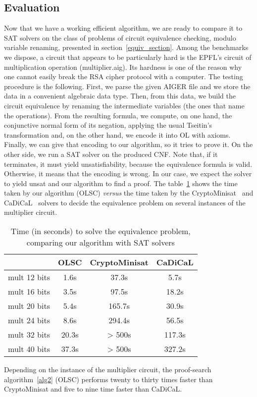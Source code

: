 \documentclass[a4paper, 11pt]{article}
\begin{document}
    \subsection{Evaluation}
    Now that we have a working efficient algorithm, we are ready to compare it to SAT solvers on the
    class of problems of circuit equivalence checking, modulo variable renaming, presented in 
    section~\ref{equiv_section}. Among the benchmarks we dispose, a circuit that appears to be
    particularly hard is the EPFL's circuit of multiplication operation (\textsf{multiplier.aig}). 
    Its hardness is one of the reason
    why one cannot easily break the RSA cipher protocol with a computer. The testing procedure is the
    following. First, we parse the given AIGER file and we store the data in a convenient algebraic
    data type. Then, from this data, we build the circuit equivalence by renaming the intermediate
    variables (the ones that name the operations). From the resulting formula, we compute, on one hand, 
    the conjunctive normal form of its negation, applying the usual Tseitin's transformation and, on 
    the other hand, we
    encode it into OL with axioms. Finally, we can give that encoding to our algorithm, so it tries
    to prove it. On the other side, we run a SAT solver on the produced CNF. Note that, if it terminates,
    it must yield unsatisfiability, because the equivalence formula is valid. Otherwise, it means that
    the encoding is wrong. 
    In our case, we expect the solver to yield unsat and our algorithm to find a proof.
    The table~\ref{benchmark_equiv} shows the time taken by our algorithm (OLSC) \textit{versus} the time
    taken by the CryptoMinisat~\cite{10.1007/978-3-642-02777-2_24} and
    CaDiCaL~\cite{BiereFallerFazekasFleuryFroleyks-CAV24} solvers to decide the equivalence problem on
    several instances of the multiplier circuit.
    \begin{table}[h] 
	    \begin{center}
		    \begin{tabular}{|c|c|c|c|}
			    \hline
			     &OLSC&CryptoMinisat&CaDiCaL\\
			     \hline
			     mult 12 bits&1.6s&37.3s&5.7s\\
			     mult 16 bits&3.5s&97.5s&18.2s\\
			     mult 20 bits&5.4s&165.7s&30.9s\\
			     mult 24 bits&8.6s&294.4s&56.5s\\
			     mult 32 bits&20.3s&> 500s&117.3s\\
			     mult 40 bits&37.3s&> 500s&327.2s\\
			     \hline
		    \end{tabular}
	    \end{center}
	    \caption{Time (in seconds) to solve the equivalence problem, comparing our algorithm with
	    SAT solvers}
	    \label{benchmark_equiv}
    \end{table}
    Depending on the instance of the multiplier circuit, the proof-search algorithm~\ref{alg2} (OLSC) 
    performs twenty to thirty times faster than CryptoMinisat and five to nine time faster than CaDiCaL.
\end{document}
